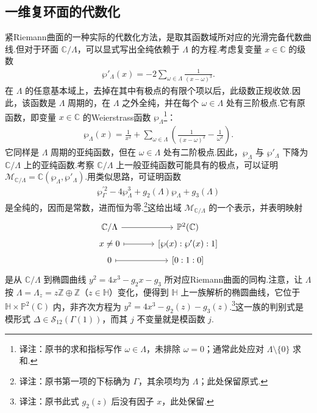\subsection{一维复环面的代数化}\label{sec:modular-2-3-2}

紧Riemann曲面的一种实际的代数化方法，是取其函数域所对应的光滑完备代数曲线.但对于环面 $\mathbb C/\Lambda$，可以显式写出全纯依赖于 $\Lambda$ 的方程.考虑复变量 $x\in\mathbb C$ 的级数
\begin{align*}
\wp'_\Lambda(x)=-2\sum_{\omega\in\Lambda}\frac1{(x-\omega)^3}.
\end{align*}
在 $\Lambda$ 的任意基本域上，去掉在其中有极点的有限个项以后，此级数正规收敛.因此，该函数是 $\Lambda$ 周期的，在 $\Lambda$ 之外全纯，并在每个 $\omega\in\Lambda$ 处有三阶极点.它有原函数，即变量 $x\in\mathbb C$ 的Weierstrass函数 $\wp_\Lambda$\footnote{译注：原书的求和指标写作 $\omega\in\Lambda$，未排除 $\omega=0$；通常此处应对 $\Lambda\setminus\{0\}$ 求和.}：
\begin{align*}
\wp_\Lambda(x)=\frac1{x^2}+\sum_{\omega\in\Lambda}\left(\frac1{(x-\omega)^2}-\frac1{\omega^2}\right).
\end{align*}
它同样是 $\Lambda$ 周期的亚纯函数，但在 $\omega\in\Lambda$ 处有二阶极点.因此，$\wp_\Lambda$ 与 $\wp'_\Lambda$ 下降为 $\mathbb C/\Lambda$ 上的亚纯函数.考察 $\mathbb C/\Lambda$ 上一般亚纯函数可能具有的极点，可以证明 $\mathcal M_{\mathbb C/\Lambda}=\mathbb C(\wp_\Lambda,\wp'_\Lambda)$.用类似思路，可证明函数
\begin{align*}
\wp_\Gamma^{\prime 2}-4\wp_\Lambda^3+g_2(\Lambda)\wp_\Lambda+g_3(\Lambda)
\end{align*}
是全纯的，因而是常数，进而恒为零.\footnote{译注：原书第一项的下标确为 $\Gamma$，其余项均为 $\Lambda$；此处保留原式.}这给出域 $\mathcal M_{\mathbb C/\Lambda}$ 的一个表示，并表明映射
\begin{equation*}
\begin{tikzcd}[column sep=large,row sep=0.2em]
\mathbb C/\Lambda \arrow[r] & \mathbb P^2(\mathbb C)\\
x\ne0 \arrow[r,mapsto] & {[\wp(x):\wp'(x):1]}\\
0 \arrow[r,mapsto] & {[0:1:0]}
\end{tikzcd}
\end{equation*}
是从 $\mathbb C/\Lambda$ 到椭圆曲线 $y^2=4x^3-g_2x-g_3$ 所对应Riemann曲面的同构.注意，让 $\Lambda$ 按 $\Lambda=\Lambda_z=z\mathbb Z\oplus\mathbb Z$（$z\in\mathbb H$）变化，便得到 $\mathbb H$ 上一族解析的椭圆曲线，它位于 $\mathbb H\times\mathbb P^2(\mathbb C)$ 内，非齐次方程为 $y^2=4x^3-g_2(z)-g_3(z)$.\footnote{译注：原书此式 $g_2(z)$ 后没有因子 $x$，此处保留.}这一族的判别式是模形式 $\Delta\in\mathcal S_{12}(\Gamma(1))$，而其 $j$ 不变量就是模函数 $j$.



